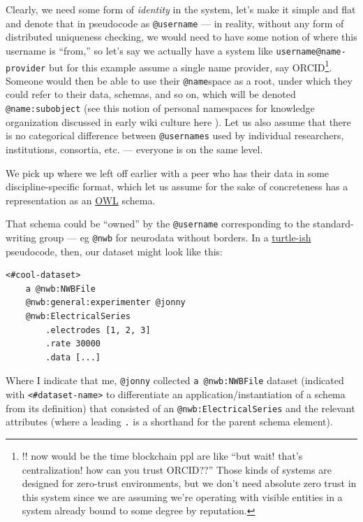 \documentclass[10pt]{tufte-book}
\begin{document}
Clearly, we need some form of \emph{identity} in the system, let's make
it simple and flat and denote that in pseudocode as \texttt{@username}
--- in reality, without any form of distributed uniqueness checking, we
would need to have some notion of where this username is ``from,'' so
let's say we actually have a system like \texttt{username@name-provider}
but for this example assume a single name provider, say
ORCID\footnote{!! now would be the time blockchain ppl are like ``but
  wait! that's centralization! how can you trust ORCID??'' Those kinds
  of systems are designed for zero-trust environments, but we don't need
  absolute zero trust in this system since we are assuming we're
  operating with visible entities in a system already bound to some
  degree by reputation.}. Someone would then be able to use their
\texttt{@name}space as a root, under which they could refer to their
data, schemas, and so on, which will be denoted \texttt{@name:subobject}
(see this notion of personal namespaces for knowledge organization
discussed in early wiki culture here \citep{MeatballWikiPersonalCategories} ). Let us also assume that there is
no categorical difference between \texttt{@usernames} used by individual
researchers, institutions, consortia, etc. --- everyone is on the same
level.

We pick up where we left off earlier with a peer who has their data in
some discipline-specific format, which let us assume for the sake of
concreteness has a representation as an
\href{https://www.w3.org/OWL/}{OWL} schema.

That schema could be ``owned'' by the \texttt{@username} corresponding
to the standard-writing group --- eg \texttt{@nwb} for neurodata without
borders. In a \href{https://www.w3.org/TR/turtle/}{turtle-ish}
pseudocode, then, our dataset might look like this:

\begin{verbatim}
<#cool-dataset>
    a @nwb:NWBFile
    @nwb:general:experimenter @jonny
    @nwb:ElectricalSeries
        .electrodes [1, 2, 3]
        .rate 30000
        .data [...]
\end{verbatim}

Where I indicate that me, \texttt{@jonny} collected
\texttt{a\ @nwb:NWBFile} dataset (indicated with
\texttt{\textless{}\#dataset-name\textgreater{}} to differentiate an
application/instantiation of a schema from its definition) that
consisted of an \texttt{@nwb:ElectricalSeries} and the relevant
attributes (where a leading \texttt{.} is a shorthand for the parent
schema element).
\end{document}
